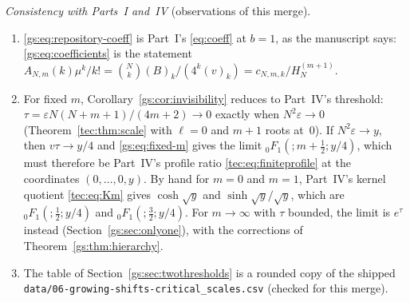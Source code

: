 \documentclass[11pt,a4paper]{article}
\numberwithin{equation}{section}
\theoremstyle{definition}
\theoremstyle{remark}
\begin{document}
\emph{Consistency with Parts~I and~IV} (observations of this merge).
\begin{enumerate}[leftmargin=*,itemsep=2pt]
\item \eqref{gs:eq:repository-coeff} is Part~I's \eqref{eq:coeff} at
 $b=1$, as the manuscript says: \eqref{gs:eq:coefficients} is the
 statement $A_{N,m}(k)\mu^k/k!=\binom Nk(B)_k/(4^k(v)_k)
 =c_{N,m,k}/H_N^{(m+1)}$.
\item For fixed $m$, Corollary~\ref{gs:cor:invisibility} reduces to
 Part~IV's threshold: $\tau=\varepsilon N(N+m+1)/(4m+2)\to0$ exactly when
 $N^2\varepsilon\to0$ (Theorem~\ref{tec:thm:scale} with $\ell=0$ and $m+1$
 roots at~$0$).  If $N^2\varepsilon\to y$, then $v\tau\to y/4$ and
 \eqref{gs:eq:fixed-m} gives the limit ${}_0F_1(;m+\frac12;y/4)$, which
 must therefore be Part~IV's profile ratio \eqref{tec:eq:finiteprofile} at
 the coordinates $(0,\ldots,0,y)$.  By hand for $m=0$ and $m=1$, Part~IV's
 kernel quotient \eqref{tec:eq:Km} gives $\cosh\sqrt y$ and
 $\sinh\sqrt y/\sqrt y$, which are ${}_0F_1(;\frac12;y/4)$ and
 ${}_0F_1(;\frac32;y/4)$.  For $m\to\infty$ with $\tau$ bounded, the limit
 is $e^\tau$ instead (Section~\ref{gs:sec:onlyone}), with the corrections
 of Theorem~\ref{gs:thm:hierarchy}.
\item The table of Section~\ref{gs:sec:twothresholds} is a rounded copy of
 the shipped \nolinkurl{data/06-growing-shifts-critical_scales.csv}
 (checked for this merge).
\end{enumerate}
\end{document}

